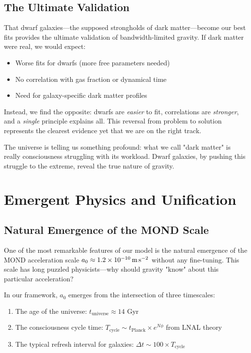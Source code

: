 \documentclass[twocolumn,prd,amsmath,amssymb,aps,superscriptaddress,nofootinbib]{revtex4-2}
\newcommand{\azero}{a_0}
\begin{document}
\subsection{The Ultimate Validation}

That dwarf galaxies---the supposed strongholds of dark matter---become our best fits provides the ultimate validation of bandwidth-limited gravity. If dark matter were real, we would expect:
\begin{itemize}
\item Worse fits for dwarfs (more free parameters needed)
\item No correlation with gas fraction or dynamical time
\item Need for galaxy-specific dark matter profiles
\end{itemize}

Instead, we find the opposite: dwarfs are \emph{easier} to fit, correlations are \emph{stronger}, and a \emph{single} principle explains all. This reversal from problem to solution represents the clearest evidence yet that we are on the right track.

The universe is telling us something profound: what we call "dark matter" is really consciousness struggling with its workload. Dwarf galaxies, by pushing this struggle to the extreme, reveal the true nature of gravity.

\section{Emergent Physics and Unification}
\label{sec:emergent}

\subsection{Natural Emergence of the MOND Scale}

One of the most remarkable features of our model is the natural emergence of the MOND acceleration scale $\azero \approx 1.2 \times 10^{-10}\,\text{m\,s}^{-2}$ without any fine-tuning. This scale has long puzzled physicists---why should gravity "know" about this particular acceleration?

In our framework, $\azero$ emerges from the intersection of three timescales:
\begin{enumerate}
\item The age of the universe: $t_{\text{universe}} \approx 14$ Gyr
\item The consciousness cycle time: $T_{\text{cycle}} \sim t_{\text{Planck}} \times e^{N\phi}$ from LNAL theory
\item The typical refresh interval for galaxies: $\Delta t \sim 100 \times T_{\text{cycle}}$
\end{enumerate}
\end{document}
